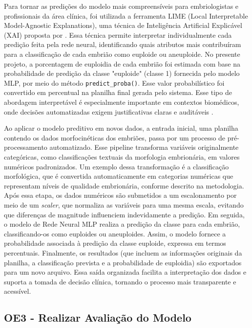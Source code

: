 Para tornar as predições do modelo mais compreensíveis para embriologistas e profissionais da área clínica, foi utilizada a ferramenta LIME (Local Interpretable Model-Agnostic Explanations), uma técnica de Inteligência Artificial Explicável (XAI) proposta por . Essa técnica permite interpretar individualmente cada predição feita pela rede neural, identificando quais atributos mais contribuíram para a classificação de cada embrião como euploide ou aneuploide. No presente projeto, a porcentagem de euploidia de cada embrião foi estimada com base na probabilidade de predição da classe "euploide" (classe 1) fornecida pelo modelo MLP, por meio do método \texttt{predict\_proba()}. Esse valor probabilístico foi convertido em percentual  na planilha final gerada pelo sistema. Esse tipo de abordagem interpretável é especialmente importante em contextos biomédicos, onde decisões automatizadas exigem justificativas claras e auditáveis \cite{arrieta2020, ribeiro2016}.

Ao aplicar o modelo preditivo em novos dados, a entrada inicial, uma planilha contendo os dados morfocinéticas dos embriões, passa por um processo de pré-processamento automatizado. Esse pipeline transforma variáveis originalmente categóricas, como classificações textuais da morfologia embrionária, em valores numéricos padronizados. Um exemplo dessa transformação é a classificação morfológica, que é convertida automaticamente em categorias numéricas que representam níveis de qualidade embrionária, conforme descrito na metodologia. Após essa etapa, os dados numéricos são submetidos a um escalonamento por meio de um \textit{scaler}, que normaliza as variáveis para uma mesma escala, evitando que diferenças de magnitude influenciem indevidamente a predição. Em seguida, o modelo de Rede Neural MLP realiza a predição da classe para cada embrião, classificando-os como euploides ou aneuploides. Assim, o modelo fornece a probabilidade associada à predição da classe euploide, expressa em termos percentuais. Finalmente, os resultados (que incluem as informações originais da planilha, a classificação prevista e a probabilidade de euploidia) são exportados para um novo arquivo. Essa saída organizada facilita a interpretação dos dados e suporta a tomada de decisão clínica, tornando o processo mais transparente e acessível.

\subsection{OE3 - Realizar Avaliação do Modelo}
